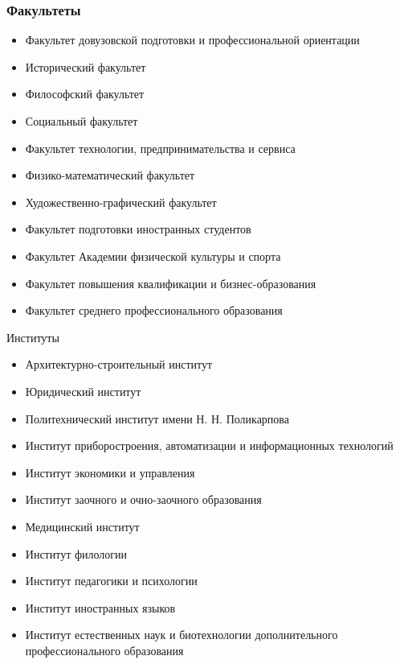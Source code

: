 \documentclass{beamer}
\begin{document}
\begin{frame}
\frametitle{Факультеты}
\begin{itemize}
  \item Факультет довузовской подготовки и профессиональной ориентации
  \item Исторический факультет
  \item Философский факультет
  \item Социальный факультет
  \item Факультет технологии, предпринимательства и сервиса
  \item Физико-математический факультет
  \item Художественно-графический факультет
  \item Факультет подготовки иностранных студентов
  \item Факультет Академии физической культуры и спорта
  \item Факультет повышения квалификации и бизнес-образования
  \item Факультет среднего профессионального образования
\end{itemize}
\end{frame}

\begin{frame}{Институты}
\begin{itemize}
    \item Архитектурно-строительный институт
    \item Юридический институт
    \item Политехнический институт имени Н. Н. Поликарпова
    \item Институт приборостроения, автоматизации и информационных технологий
    \item Институт экономики и управления
    \item Институт заочного и очно-заочного образования
    \item Медицинский институт
    \item Институт филологии
    \item Институт педагогики и психологии
    \item Институт иностранных языков
    \item Институт естественных наук и биотехнологии
     дополнительного профессионального образования
\end{itemize}
\end{frame}
\end{document}
